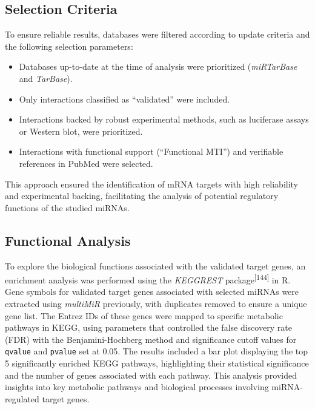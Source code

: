 \documentclass[
  11pt,
  letterpaper,
]{book}
\begin{document}
\subsection{Selection Criteria}\label{selection-criteria}

To ensure reliable results, databases were filtered according to update
criteria and the following selection parameters:

\begin{itemize}
\item
  Databases up-to-date at the time of analysis were prioritized
  (\emph{miRTarBase} and \emph{TarBase}).
\item
  Only interactions classified as ``validated'' were included.
\item
  Interactions backed by robust experimental methods, such as luciferase
  assays or Western blot, were prioritized.
\item
  Interactions with functional support (``Functional MTI'') and
  verifiable references in PubMed were selected.
\end{itemize}

This approach ensured the identification of mRNA targets with high
reliability and experimental backing, facilitating the analysis of
potential regulatory functions of the studied miRNAs.

\subsection{Functional Analysis}\label{functional-analysis}

To explore the biological functions associated with the validated target
genes, an enrichment analysis was performed using the \emph{KEGGREST}
package\textsuperscript{{[}144{]}} in R. Gene symbols for validated
target genes associated with selected miRNAs were extracted using
\emph{multiMiR} previously, with duplicates removed to ensure a unique
gene list. The Entrez IDs of these genes were mapped to specific
metabolic pathways in KEGG, using parameters that controlled the false
discovery rate (FDR) with the Benjamini-Hochberg method and significance
cutoff values for \texttt{qvalue} and \texttt{pvalue} set at 0.05. The
results included a bar plot displaying the top 5 significantly enriched
KEGG pathways, highlighting their statistical significance and the
number of genes associated with each pathway. This analysis provided
insights into key metabolic pathways and biological processes involving
miRNA-regulated target genes.
\end{document}
